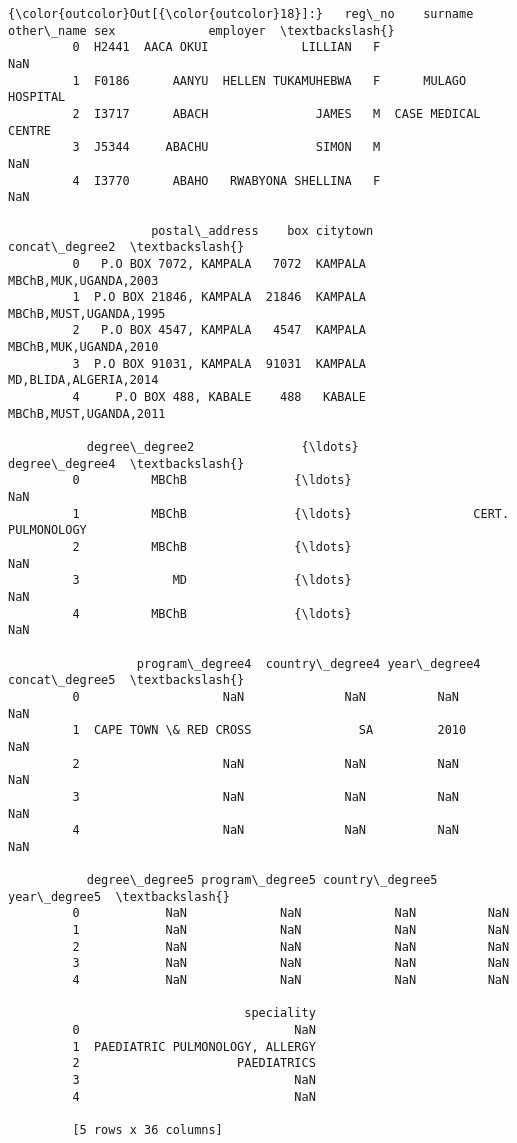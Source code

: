 \documentclass[11pt]{article}
\begin{document}
\begin{Verbatim}[commandchars=\\\{\}]
{\color{outcolor}Out[{\color{outcolor}18}]:}   reg\_no    surname          other\_name sex             employer  \textbackslash{}
         0  H2441  AACA OKUI             LILLIAN   F                  NaN   
         1  F0186      AANYU  HELLEN TUKAMUHEBWA   F      MULAGO HOSPITAL   
         2  I3717      ABACH               JAMES   M  CASE MEDICAL CENTRE   
         3  J5344     ABACHU               SIMON   M                  NaN   
         4  I3770      ABAHO   RWABYONA SHELLINA   F                  NaN   
         
                    postal\_address    box citytown          concat\_degree2  \textbackslash{}
         0   P.O BOX 7072, KAMPALA   7072  KAMPALA   MBChB,MUK,UGANDA,2003   
         1  P.O BOX 21846, KAMPALA  21846  KAMPALA  MBChB,MUST,UGANDA,1995   
         2   P.O BOX 4547, KAMPALA   4547  KAMPALA   MBChB,MUK,UGANDA,2010   
         3  P.O BOX 91031, KAMPALA  91031  KAMPALA   MD,BLIDA,ALGERIA,2014   
         4     P.O BOX 488, KABALE    488   KABALE  MBChB,MUST,UGANDA,2011   
         
           degree\_degree2               {\ldots}                    degree\_degree4  \textbackslash{}
         0          MBChB               {\ldots}                               NaN   
         1          MBChB               {\ldots}                 CERT. PULMONOLOGY   
         2          MBChB               {\ldots}                               NaN   
         3             MD               {\ldots}                               NaN   
         4          MBChB               {\ldots}                               NaN   
         
                  program\_degree4  country\_degree4 year\_degree4 concat\_degree5  \textbackslash{}
         0                    NaN              NaN          NaN            NaN   
         1  CAPE TOWN \& RED CROSS               SA         2010            NaN   
         2                    NaN              NaN          NaN            NaN   
         3                    NaN              NaN          NaN            NaN   
         4                    NaN              NaN          NaN            NaN   
         
           degree\_degree5 program\_degree5 country\_degree5 year\_degree5  \textbackslash{}
         0            NaN             NaN             NaN          NaN   
         1            NaN             NaN             NaN          NaN   
         2            NaN             NaN             NaN          NaN   
         3            NaN             NaN             NaN          NaN   
         4            NaN             NaN             NaN          NaN   
         
                                 speciality  
         0                              NaN  
         1  PAEDIATRIC PULMONOLOGY, ALLERGY  
         2                      PAEDIATRICS  
         3                              NaN  
         4                              NaN  
         
         [5 rows x 36 columns]
\end{Verbatim}
            
\end{document}
